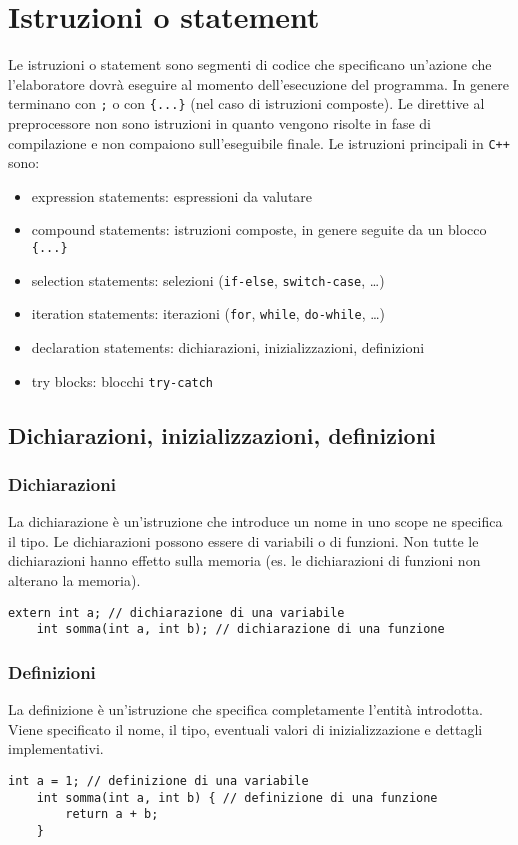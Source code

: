 \documentclass[a4paper]{article}
\newcommand{\cpp}{\texttt{C++} } %
\begin{document}
\newpage

\section{Istruzioni o statement}
Le istruzioni o statement sono segmenti di codice che specificano un'azione che l'elaboratore dovrà eseguire al momento
dell'esecuzione del programma. In genere terminano con \verb|;| o con \verb|{...}| (nel caso di istruzioni composte).
Le direttive al preprocessore non sono istruzioni in quanto vengono risolte in fase di compilazione e non compaiono
sull'eseguibile finale. Le istruzioni principali in \cpp sono:
\begin{itemize}
	\item expression statements: espressioni da valutare
	\item compound statements: istruzioni composte, in genere seguite da un blocco \verb|{...}|
	\item selection statements: selezioni (\verb|if-else|, \verb|switch-case|, \dots)
	\item iteration statements: iterazioni (\verb|for|, \verb|while|, \verb|do-while|, \dots)
	\item declaration statements: dichiarazioni, inizializzazioni, definizioni
	\item try blocks: blocchi \verb|try-catch|
\end{itemize}

\subsection{Dichiarazioni, inizializzazioni, definizioni}
\subsubsection*{Dichiarazioni}
La dichiarazione è un'istruzione che introduce un nome in uno scope ne specifica il tipo. Le dichiarazioni possono essere di
variabili o di funzioni. Non tutte le dichiarazioni hanno effetto sulla memoria (es. le dichiarazioni di funzioni non alterano
la memoria).
\begin{lstlisting}[numbers=none]
	extern int a; // dichiarazione di una variabile
	int somma(int a, int b); // dichiarazione di una funzione
\end{lstlisting}

\subsubsection*{Definizioni}
La definizione è un'istruzione che specifica completamente l'entità introdotta. Viene specificato il nome, il tipo, eventuali
valori di inizializzazione e dettagli implementativi.
\begin{lstlisting}[numbers=none]
	int a = 1; // definizione di una variabile
	int somma(int a, int b) { // definizione di una funzione
		return a + b;
	}
\end{lstlisting}
\end{document}
